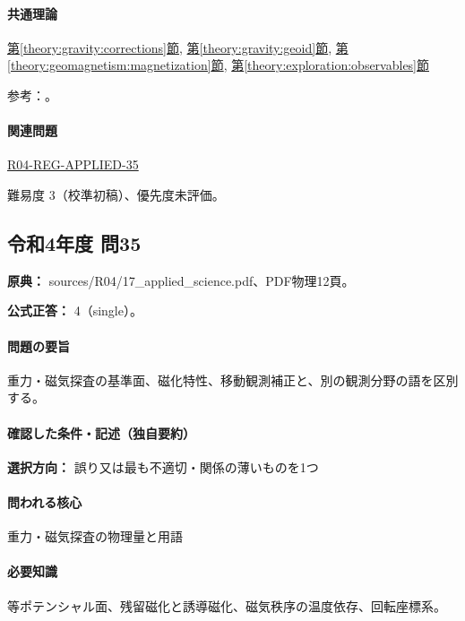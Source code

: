 \paragraph{共通理論} \hyperref[theory:gravity:corrections]{第\ref*{theory:gravity:corrections}節}, \hyperref[theory:gravity:geoid]{第\ref*{theory:gravity:geoid}節}, \hyperref[theory:geomagnetism:magnetization]{第\ref*{theory:geomagnetism:magnetization}節}, \hyperref[theory:exploration:observables]{第\ref*{theory:exploration:observables}節}

\par 参考：\cite{gsi_gravity_definitions,kanaya_okuma2011}。

\paragraph{関連問題} \hyperref[q:r04-reg-applied-35]{R04-REG-APPLIED-35}

\par 難易度 3（校準初稿）、優先度未評価。

\subsection{令和4年度 問35}
\label{q:r04-reg-applied-35}

\noindent\textbf{原典：} sources/R04/17\_applied\_science.pdf、PDF物理12頁。

\textbf{公式正答：} 4（single）。

\paragraph{問題の要旨} 重力・磁気探査の基準面、磁化特性、移動観測補正と、別の観測分野の語を区別する。

\paragraph{確認した条件・記述（独自要約）}\mbox{}\par

\noindent\textbf{選択方向：} 誤り又は最も不適切・関係の薄いものを1つ\par

\paragraph{問われる核心} 重力・磁気探査の物理量と用語

\paragraph{必要知識} 等ポテンシャル面、残留磁化と誘導磁化、磁気秩序の温度依存、回転座標系。

